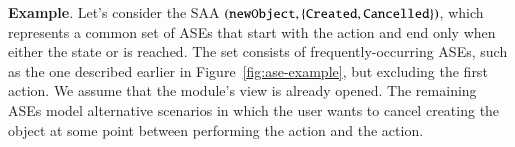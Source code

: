 \noindent\textbf{Example}. 
Let's consider the SAA $({\tt newObject}, \{ {\tt Created},{\tt Cancelled} \})$, which represents a common set of ASEs that start with the action  and end only when either the state  or  is reached. The set consists of frequently-occurring ASEs, such as the one described earlier in Figure~\ref{fig:ase-example}, but excluding the first action. We assume that the module's view is already opened. The remaining ASEs model alternative scenarios in which the user wants to cancel creating the object at some point between performing the  action and the  action.





